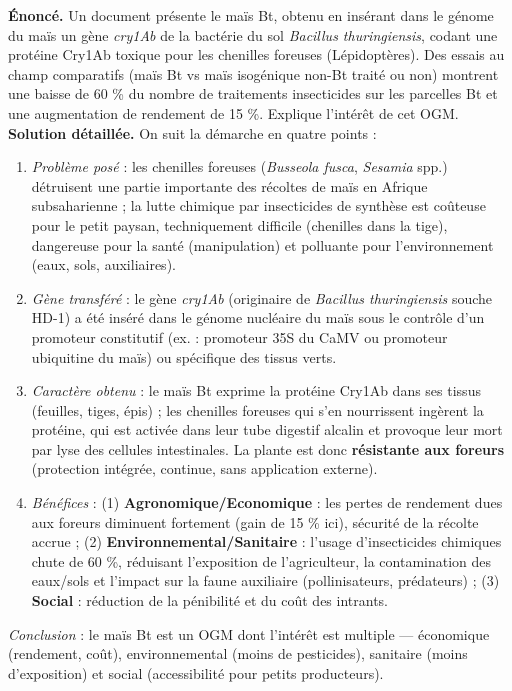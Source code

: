 \documentclass[11pt]{article}
\begin{document}
\begin{exoresolu}
\textbf{Énoncé.} Un document présente le maïs Bt, obtenu en insérant dans le génome du maïs un gène \emph{cry1Ab} de la bactérie du sol \emph{Bacillus thuringiensis}, codant une protéine Cry1Ab toxique pour les chenilles foreuses (Lépidoptères). Des essais au champ comparatifs (maïs Bt vs maïs isogénique non-Bt traité ou non) montrent une baisse de 60 \% du nombre de traitements insecticides sur les parcelles Bt et une augmentation de rendement de 15 \%. Explique l'intérêt de cet OGM.
\tcblower
\textbf{Solution détaillée.} On suit la démarche en quatre points :
\begin{enumerate}
\item \emph{Problème posé} : les chenilles foreuses (\emph{Busseola fusca}, \emph{Sesamia} spp.) détruisent une partie importante des récoltes de maïs en Afrique subsaharienne ; la lutte chimique par insecticides de synthèse est coûteuse pour le petit paysan, techniquement difficile (chenilles dans la tige), dangereuse pour la santé (manipulation) et polluante pour l'environnement (eaux, sols, auxiliaires).
\item \emph{Gène transféré} : le gène \emph{cry1Ab} (originaire de \emph{Bacillus thuringiensis} souche HD-1) a été inséré dans le génome nucléaire du maïs sous le contrôle d'un promoteur constitutif (ex. : promoteur 35S du CaMV ou promoteur ubiquitine du maïs) ou spécifique des tissus verts.
\item \emph{Caractère obtenu} : le maïs Bt exprime la protéine Cry1Ab dans ses tissus (feuilles, tiges, épis) ; les chenilles foreuses qui s'en nourrissent ingèrent la protéine, qui est activée dans leur tube digestif alcalin et provoque leur mort par lyse des cellules intestinales. La plante est donc \textbf{résistante aux foreurs} (protection intégrée, continue, sans application externe).
\item \emph{Bénéfices} : (1) \textbf{Agronomique/Economique} : les pertes de rendement dues aux foreurs diminuent fortement (gain de 15 \% ici), sécurité de la récolte accrue ; (2) \textbf{Environnemental/Sanitaire} : l'usage d'insecticides chimiques chute de 60 \%, réduisant l'exposition de l'agriculteur, la contamination des eaux/sols et l'impact sur la faune auxiliaire (pollinisateurs, prédateurs) ; (3) \textbf{Social} : réduction de la pénibilité et du coût des intrants.
\end{enumerate}
\emph{Conclusion} : le maïs Bt est un OGM dont l'intérêt est multiple — économique (rendement, coût), environnemental (moins de pesticides), sanitaire (moins d'exposition) et social (accessibilité pour petits producteurs).
\end{exoresolu}
\end{document}
